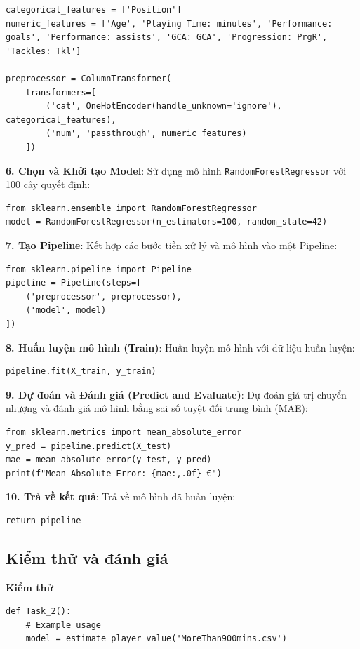 \documentclass[12pt]{report}
\begin{document}
{\begin{verbatim}
categorical_features = ['Position']
numeric_features = ['Age', 'Playing Time: minutes', 'Performance: goals', 'Performance: assists', 'GCA: GCA', 'Progression: PrgR', 'Tackles: Tkl']

preprocessor = ColumnTransformer(
    transformers=[
        ('cat', OneHotEncoder(handle_unknown='ignore'), categorical_features),
        ('num', 'passthrough', numeric_features)
    ])
\end{verbatim}

\textbf{6. Chọn và Khởi tạo Model}:
Sử dụng mô hình \texttt{RandomForestRegressor} với 100 cây quyết định:
\begin{verbatim}
from sklearn.ensemble import RandomForestRegressor
model = RandomForestRegressor(n_estimators=100, random_state=42)
\end{verbatim}

\textbf{7. Tạo Pipeline}:
Kết hợp các bước tiền xử lý và mô hình vào một Pipeline:
\begin{verbatim}
from sklearn.pipeline import Pipeline
pipeline = Pipeline(steps=[
    ('preprocessor', preprocessor),
    ('model', model)
])
\end{verbatim}

\textbf{8. Huấn luyện mô hình (Train)}:
Huấn luyện mô hình với dữ liệu huấn luyện:
\begin{verbatim}
pipeline.fit(X_train, y_train)
\end{verbatim}

\textbf{9. Dự đoán và Đánh giá (Predict and Evaluate)}:
Dự đoán giá trị chuyển nhượng và đánh giá mô hình bằng sai số tuyệt đối trung bình (MAE):
\begin{verbatim}
from sklearn.metrics import mean_absolute_error
y_pred = pipeline.predict(X_test)
mae = mean_absolute_error(y_test, y_pred)
print(f"Mean Absolute Error: {mae:,.0f} €")
\end{verbatim}

\textbf{10. Trả về kết quả}:
Trả về mô hình đã huấn luyện:
\begin{verbatim}
return pipeline
\end{verbatim}

\subsection{Kiểm thử và đánh giá}
\textbf{Kiểm thử}\\
\begin{lstlisting}
def Task_2():
    # Example usage
    model = estimate_player_value('MoreThan900mins.csv')


\end{lstlisting}}
\end{document}

